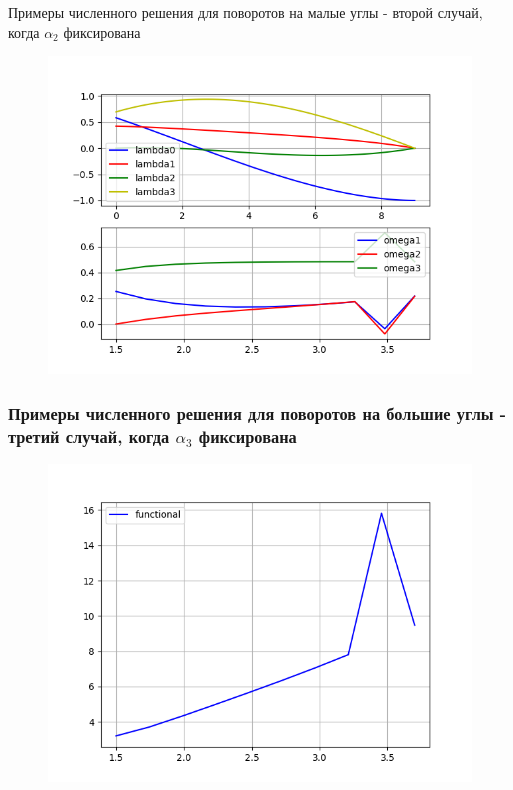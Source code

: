 \documentclass[10pt,utf8,presentation,notheorems,xcolor=dvipsnames,compress]{beamer}
\begin{document}
\begin{frame}{Примеры численного решения для поворотов на малые углы - второй случай, когда $\alpha_2$ фиксирована}
\begin{figure}[H]
\center\includegraphics[scale=0.5]{fig/ivp_and_control_1_5-3_7_50.png}
\caption{}
\end{figure}
\end{frame}

\begin{frame}
\frametitle{Примеры численного решения для поворотов на большие углы - третий случай, когда $\alpha_3$ фиксирована}
\begin{figure}[H]
\center\includegraphics[scale=0.5]{fig/functional_1_5-3_7_50.png}
\caption{}
\end{figure}
\end{frame}
\end{document}
